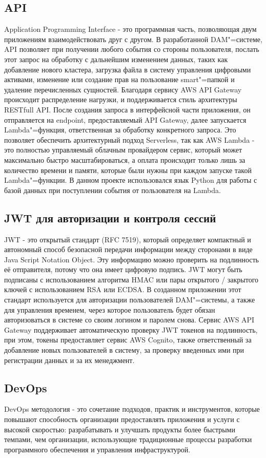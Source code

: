 \subsection{API}
Application Programming Interface - это программная часть, позволяющая двум приложениям взаимодействовать друг с другом. В разработанной DAM"=системе, API позволяет при получении любого события со стороны пользователя, послать этот запрос на обработку с дальнейшим изменением данных, таких как добавление нового кластера, загрузка файла в систему управления цифровыми активами, изменение или создание прав на пользование smart"=папкой и удаление перечисленных сущностей. Благодаря сервису AWS API Gateway происходит распределение нагрузки, и поддерживается стиль архитектуры RESTfull API. После создания запроса в интерфейсной части приложения, он отправляется на endpoint, предоставляемый API Gateway, далее запускается Lambda"=функция, ответственная за обработку конкретного запроса. Это позволяет обеспечить архитектурный подход Serverless, так как AWS Lambda - это полностью управляемый облачным провайдером сервис, который может максимально быстро масштабироваться, а оплата происходит только лишь за количество времени и памяти, которые были нужны при каждом запуске такой Lambda"=функции. В данном проекте использовался язык Python для работы с базой данных при поступлении события от пользователя на Lambda.


\subsection{JWT для авторизации и контроля сессий}
JWT - это открытый стандарт (RFC 7519), который определяет компактный и автономный способ безопасной передачи информации между сторонами в виде Java Script Notation Object. Эту информацию можно проверить на подлинность её отправителя, потому что она имеет цифровую подпись. JWT могут быть подписаны с использованием алгоритма HMAC или пары открытого / закрытого ключей с использованием RSA или ECDSA. В созданном приложении этот стандарт используется для авторизации пользователей DAM"=системы, а также для управления временем, через которое пользователь будет обязан авторизоваться в системе со своим логином и паролем снова. Сервис AWS API Gateway поддерживает автоматическую проверку JWT токенов на подлинность, при этом, токены предоставляет сервис AWS Cognito, также ответственный за добавление новых пользователей в систему, за проверку введенных ими при регистрации данных и за их менеджмент.

\subsection{DevOps}
DevOps методология - это сочетание подходов, практик и инструментов, которые повышают способность организации предоставлять приложения и услуги с высокой скоростью: разрабатывать и улучшать продукты более быстрыми темпами, чем организации, использующие традиционные процессы разработки программного обеспечения и управления инфраструктурой.

